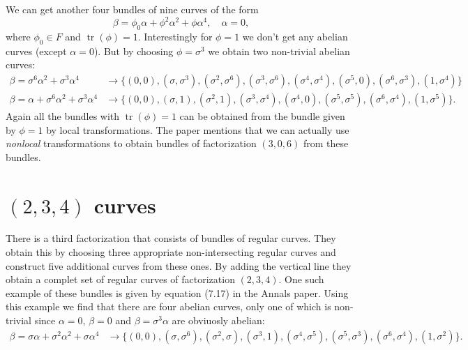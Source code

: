 \documentclass[a4paper]{article}
\DeclareMathOperator{\tr}{tr}
\begin{document}
  We can get another four bundles of nine curves of the form
  \begin{equation}
    \beta = \phi_0 \alpha + \phi^2 \alpha^2 + \phi
    \alpha^{4},
    \quad
    \alpha = 0,
  \end{equation}
  where $\phi_0 \in F$ and $\tr(\phi) = 1$. Interestingly
  for $\phi = 1$ we don't get any abelian curves
  (except $\alpha=0$). But by choosing $\phi = \sigma^3$ we
  obtain two non-trivial abelian curves:
  \begin{align}
    \beta = \sigma^{6} \alpha^2 + \sigma^3 \alpha^{4}
    &\to 
    \{
      (0,0), (\sigma,\sigma^3), (\sigma^2,\sigma^{6}),
      (\sigma^3,\sigma^{6}), (\sigma^{4},\sigma^{4}), 
      (\sigma^{5},0), (\sigma^{6},\sigma^3), (1,\sigma^{4})
    \} \\
    \beta = \alpha + \sigma^{6} \alpha^2 + \sigma^3
    \alpha^{4}
    &\to
    \{
      (0,0), (\sigma,1), (\sigma^2,1),
      (\sigma^3,\sigma^{4}), (\sigma^{4},0),
      (\sigma^{5},\sigma^{5}), (\sigma^{6},\sigma^{4}), 
      (1,\sigma^{5})
    \}.
  \end{align}
  Again all the bundles with $\tr(\phi) = 1$ can be obtained
  from the bundle given by $\phi = 1$ by local
  transformations. The paper mentions that we can actually
  use \textit{nonlocal} transformations to obtain bundles of
  factorization $(3,0,6)$ from these bundles.

  \section{$(2,3,4)$ curves}

  There is a third factorization that consists of bundles
  of regular curves. They obtain this by choosing three
  appropriate non-intersecting regular curves and construct
  five additional curves from these ones. By adding the
  vertical line they obtain a complet set of regular curves
  of factorization $(2,3,4)$. One such example of these
  bundles is given by equation (7.17) in the Annals paper.
  Using this example we find that there are four abelian
  curves, only one of which is non-trivial since $\alpha=0$,
  $\beta=0$ and $\beta = \sigma^{3}\alpha$ are obviuosly
  abelian:
  \begin{align}
    \beta = \sigma \alpha + \sigma^2 \alpha^2 + \sigma
    \alpha^{4} 
    &\to 
    \{
      (0,0), (\sigma,\sigma^{6}), (\sigma^2,\sigma), 
      (\sigma^3,1), (\sigma^{4},\sigma^{5}), 
      (\sigma^{5},\sigma^3), (\sigma^{6},\sigma^{4}),
      (1,\sigma^2)
    \}.
  \end{align}
\end{document}
